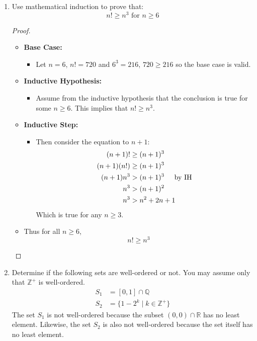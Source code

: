 \documentclass[class=article, crop=false]{standalone}
\def\reals{{\mathbb R}}
\def\integers{{\mathbb Z}}
\def\rationals{{\mathbb Q}}
\begin{document}
\begin{enumerate}[1.]
	\item Use mathematical induction to prove that: $$n!\geq n^3 \text{ for } n\geq 6$$
	
	\begin{proof}
		$ $\\
		\begin{itemize}
			\item[] \textbf{Base Case:}
			\begin{itemize}
				\item[] Let $n=6$, $n! = 720$ and $6^3=216$, $720\geq 216$ so the base case is valid.
			\end{itemize}
			\item[] \textbf{Inductive Hypothesis:}
			\begin{itemize}
				\item[] Assume from the inductive hypothesis that the conclusion is true for some $n\geq 6$.
				This implies that $n!\geq n^3$.
			\end{itemize}
			\item[] \textbf{Inductive Step:}
			\begin{itemize}
				\item[] Then consider the equation to $n+1$:
				\begin{align*}
					(n+1)! &\geq (n+1)^3 \\
					(n+1)(n!) &\geq (n+1)^3 \\
					(n+1)n^3 &> (n+1)^3 \hspace{5mm}\text{by IH} \\
					n^3 &> (n+1)^2 \\
					n^3 &> n^2 + 2n + 1
				\end{align*}
				Which is true for any $n\geq 3$.
			\end{itemize}
			\item[] Thus for all $n\geq 6$,
			$$n!\geq n^3$$
		\end{itemize}
	\end{proof}
	
	\item Determine if the following sets are well-ordered or not.
	You may assume only that $\integers^+$ is well-ordered.
	\begin{align*}
		S_1 &= [0,1]\cap \rationals \\
		S_2 &= \{1-2^k \mid k\in\integers^+ \}
	\end{align*}
	The set $S_1$ is not well-ordered because the subset $(0,0)\cap \reals$ has no least element.
	Likewise, the set $S_2$ is also not well-ordered because the set itself has no least element.


\end{enumerate}
\end{document}
